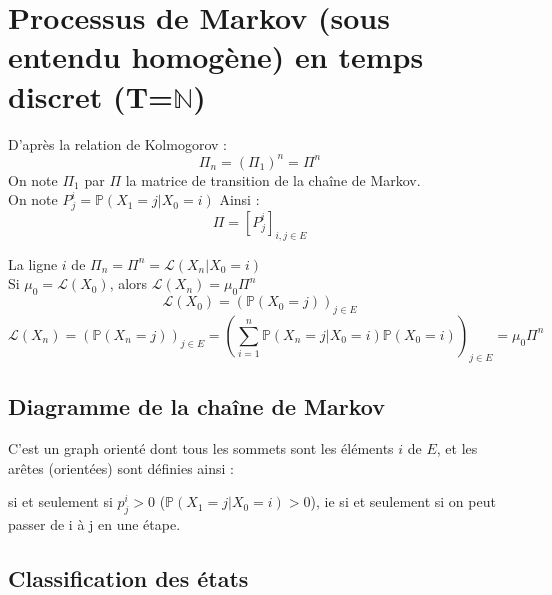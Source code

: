 \section{Processus de Markov (sous entendu homogène) en temps discret (T=$\mathbb{N}$)}
D'après la relation de Kolmogorov :
\[\Pi_n=(\Pi_1)^n = \Pi^n\]
On note $\Pi_1$ par $\Pi$ la matrice de transition de la chaîne de Markov.\\
On note $P_j^i=\mathbb{P}(X_1=j|X_0=i)$ Ainsi : \[\Pi=[P_j^i]_{i,j\in E}\]

\bigskip
La ligne $i$ de $\Pi_n=\Pi^n=\mathcal{L}(X_n|X_0=i)$\\
Si $\mu_0=\mathcal{L}(X_0)$, alors $\mathcal{L}(X_n)=\mu_0\Pi^n$\\
\[\mathcal{L}(X_0)=(\mathbb{P}(X_0=j))_{j\in E}\]
\[\mathcal{L}(X_n)=\left(\mathbb{P}(X_n=j)\right)_{j\in E}=\left(\sum_{i=1}^n \mathbb{P}(X_n=j|X_0=i)\mathbb{P}(X_0=i)\right)_{j\in E}=\mu_0\Pi^n\]

\subsection{Diagramme de la chaîne de Markov}
C'est un graph orienté dont tous les sommets sont les éléments $i$ de $E$, et les arêtes (orientées) sont définies ainsi : \\
si et seulement si $p_j^i>0$ ($\mathbb{P}(X_1=j|X_0=i)>0$), ie si et seulement si on peut passer de i à j en une étape.

\subsection{Classification des états}

